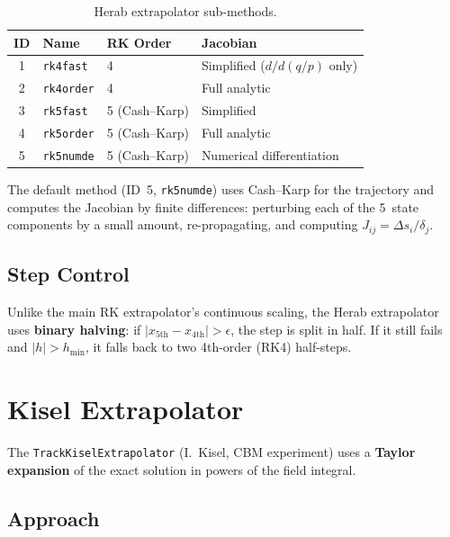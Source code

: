 \documentclass[11pt,a4paper]{article}
\newcommand{\qop}{q/p}
\begin{document}
\begin{table}[H]
\centering
\caption{Herab extrapolator sub-methods.}
\begin{tabular}{@{}clll@{}}
\toprule
\textbf{ID} & \textbf{Name} & \textbf{RK Order} & \textbf{Jacobian} \\
\midrule
1 & \texttt{rk4fast}    & 4 & Simplified ($d/d(\qop)$ only) \\
2 & \texttt{rk4order}   & 4 & Full analytic \\
3 & \texttt{rk5fast}    & 5 (Cash--Karp) & Simplified \\
4 & \texttt{rk5order}   & 5 (Cash--Karp) & Full analytic \\
5 & \texttt{rk5numde}   & 5 (Cash--Karp) & Numerical differentiation \\
\bottomrule
\end{tabular}
\end{table}

The default method (ID~5, \texttt{rk5numde}) uses Cash--Karp for the
trajectory and computes the Jacobian by finite differences: perturbing each of
the 5~state components by a small amount, re-propagating, and computing
$J_{ij} = \Delta s_i / \delta_j$.

\subsection{Step Control}

Unlike the main RK extrapolator's continuous scaling, the Herab extrapolator
uses \textbf{binary halving}: if $|x_\text{5th} - x_\text{4th}| > \epsilon$,
the step is split in half. If it still fails and $|h| > h_\text{min}$, it
falls back to two 4th-order (RK4) half-steps.


\section{Kisel Extrapolator}\label{sec:kisel}

The \texttt{TrackKiselExtrapolator} (I.~Kisel, CBM experiment) uses a
\textbf{Taylor expansion} of the exact solution in powers of the field integral.

\subsection{Approach}
\end{document}
